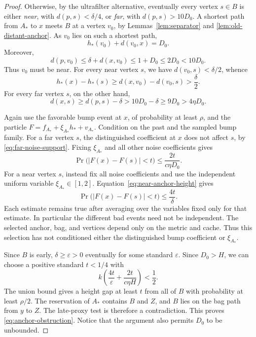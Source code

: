 \begin{proof}
Otherwise, by the ultrafilter alternative, eventually every vertex
$s\in B$ is either \emph{near}, with $d(p,s)<\delta/4$, or \emph{far},
with $d(p,s)>10D_0$.  A shortest path from $A_*$ to $x$ meets $B$ at a
vertex $v_0$, by Lemmas~\ref{lem:separator} and
\ref{lem:old-distant-anchor}.  As $v_0$ lies on such a shortest path,
\[
 h_*(v_0)+d(v_0,x)=D_0.
\]
Moreover,
\[
 d(p,v_0)\leq\delta+d(x,v_0)\leq1+D_0\leq2D_0<10D_0.
\]
Thus $v_0$ must be near.  For every near vertex $s$, we have
$d(v_0,s)<\delta/2$, whence
\begin{equation}\label{eq:near-anchor-height}
 h_*(x)-h_*(s)
 \geq d(x,v_0)-d(v_0,s)>\frac{\delta}{2}.
\end{equation}
For every far vertex $s$, on the other hand,
\begin{equation}\label{eq:far-noise-support}
 d(x,s)\geq d(p,s)-\delta>10D_0-\delta\geq9D_0>4\eta D_0.
\end{equation}

Again use the favorable bump event at $x$, of probability at
least $\rho$, and the particle
$F=f_{A_*}+\xi_{A_*}h_*+v_{A_*}$.  Condition on the past and the sampled bump family.  For a far vertex $s$, the distinguished coefficient at $x$
does not affect $s$, by \eqref{eq:far-noise-support}.  Fixing
$\xi_{A_*}$ and all other noise coefficients gives
\[
 \Pr\bigl(|F(x)-F(s)|<t\bigr)
 \leq\frac{2t}{c\eta D_0}.
\]
For a near vertex $s$, instead fix all noise coefficients and use the
independent uniform variable $\xi_{A_*}\in[1,2]$.
Equation~\eqref{eq:near-anchor-height} gives
\[
 \Pr\bigl(|F(x)-F(s)|<t\bigr)\leq\frac{4t}{\delta}.
\]
Each estimate remains true after averaging over the variables fixed only
for that estimate.  In particular the different bad events need not be
independent.  The selected anchor, bag, and vertices depend only on the
metric and cache.  Thus this selection has not conditioned either the
distinguished bump coefficient or $\xi_{A_*}$.

Since $B$ is early, $\delta\geq\varepsilon>0$ eventually for some
standard $\varepsilon$.  Since $D_0>H$, we can choose a positive
standard $t<1/4$ with
\[
 k\left(\frac{4t}{\varepsilon}
       +\frac{2t}{c\eta H}\right)<\frac12.
\]
The union bound gives a height gap at least $t$ from all of $B$ with
probability at least $\rho/2$.  The reservation of $A_*$ contains $B$
and $Z$, and $B$ lies on the bag path from $y$ to $Z$.  The late-proxy
test is therefore a contradiction.  This proves
\eqref{eq:anchor-obstruction}.  Notice that the argument also permits
$D_0$ to be unbounded.
\end{proof}

